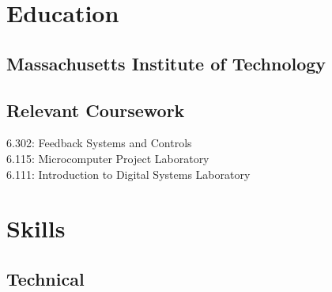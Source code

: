 \documentclass[letterpaper, article]{deedy-resume-openfont}
\begin{document}
\hfill
%
%
\begin{minipage}[t]{0.33\textwidth}

\vspace{\topsep}


\section{Education}

\subsection{Massachusetts Institute of Technology \hfill}
\sectionsep

\subsection{Relevant Coursework \hfill}
\vspace{.05cm}
6.302: Feedback Systems and Controls\\
6.115: Microcomputer Project Laboratory \\
6.111: Introduction to Digital Systems Laboratory




\section{Skills}
\subsection{Technical}


\end{minipage}
\end{document}
